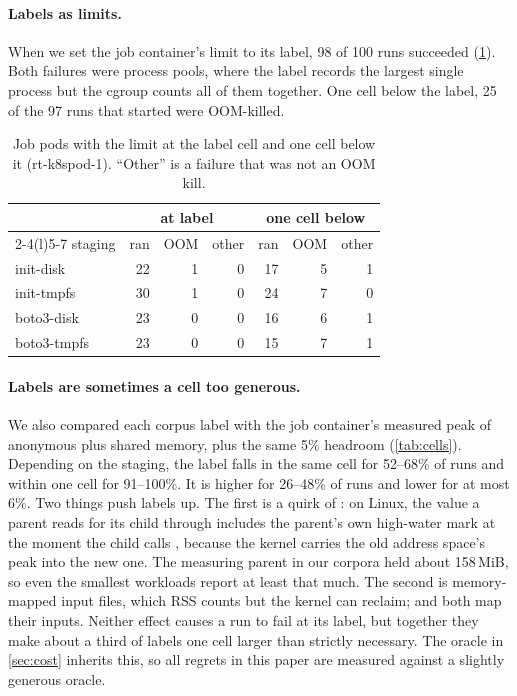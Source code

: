 \paragraph{Labels as limits.}
When we set the job container's limit to its label, 98 of 100 runs succeeded
(\cref{tab:limits}). Both failures were process pools, where the label records the largest
single process but the cgroup counts all of them together. One cell below the label, 25
of the 97 runs that started were OOM-killed.

\begin{table}[tbp]
\centering\small
\caption{Job pods with the limit at the label cell and one cell below it (rt-k8spod-1).
``Other'' is a failure that was not an OOM kill.}
\label{tab:limits}
\begin{tabular}{@{}lrrrrrr@{}}
\toprule
& \multicolumn{3}{c}{at label} & \multicolumn{3}{c}{one cell below} \\
\cmidrule(lr){2-4}\cmidrule(l){5-7}
staging & ran & OOM & other & ran & OOM & other \\
\midrule
init-disk   & 22 & 1 & 0 & 17 & 5 & 1 \\
init-tmpfs  & 30 & 1 & 0 & 24 & 7 & 0 \\
boto3-disk  & 23 & 0 & 0 & 16 & 6 & 1 \\
boto3-tmpfs & 23 & 0 & 0 & 15 & 7 & 1 \\
\bottomrule
\end{tabular}
\end{table}

\paragraph{Labels are sometimes a cell too generous.}
We also compared each corpus label with the job container's measured peak of anonymous
plus shared memory, plus the same 5\% headroom (\cref{tab:cells}). Depending on the
staging, the label falls in the same cell for 52--68\% of runs and within one cell for
91--100\%. It is higher for 26--48\% of runs and lower for at most 6\%. Two things push
labels up. The first is a quirk of : on Linux, the value a parent reads
for its child through  includes the parent's own high-water mark at the moment
the child calls , because the kernel carries the old address space's peak into
the new one. The measuring parent in our corpora held about 158\,MiB, so even the smallest
workloads report at least that much. The second is memory-mapped input files, which RSS
counts but the kernel can reclaim;  and  both map
their inputs. Neither effect causes a run to fail at its label, but together they make
about a third of labels one cell larger than strictly necessary. The oracle in
\cref{sec:cost} inherits this, so all regrets in this paper are measured against a
slightly generous oracle.

